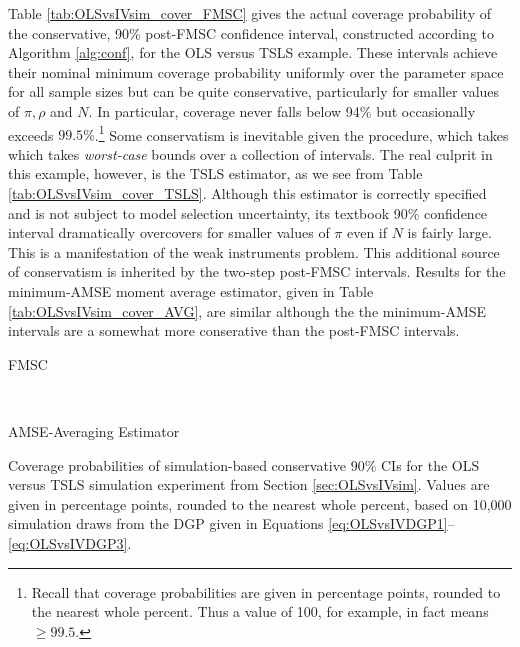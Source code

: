 Table \ref{tab:OLSvsIVsim_cover_FMSC} gives the actual coverage probability of the conservative, 90\% post-FMSC confidence interval, constructed according to Algorithm \ref{alg:conf}, for the OLS versus TSLS example.
These intervals achieve their nominal minimum coverage probability uniformly over the parameter space for all sample sizes but can be quite conservative, particularly for smaller values of $\pi, \rho$ and $N$. 
In particular, coverage never falls below 94\% but occasionally exceeds $99.5\%$.\footnote{Recall that coverage probabilities are given in percentage points, rounded to the nearest whole percent. Thus a value of 100, for example, in fact means $\geq 99.5$.}
Some conservatism is inevitable given the procedure, which takes which takes \emph{worst-case} bounds over a collection of intervals.
The real culprit in this example, however, is the TSLS estimator, as we see from Table \ref{tab:OLSvsIVsim_cover_TSLS}.
Although this estimator is correctly specified and is not subject to model selection uncertainty, its textbook 90\% confidence interval dramatically overcovers for smaller values of $\pi$ even if $N$ is fairly large.
This is a manifestation of the weak instruments problem.
This additional source of conservatism is inherited by the two-step post-FMSC intervals.
Results for the minimum-AMSE moment average estimator, given in Table \ref{tab:OLSvsIVsim_cover_AVG}, are  similar although the the minimum-AMSE intervals are a somewhat more conserative than the post-FMSC intervals.

\begin{table}[h]
\footnotesize
\centering
	\begin{subtable}{0.48\textwidth}
		\caption{FMSC}
		
		\label{tab:OLSvsIVsim_cover_FMSC}
	\end{subtable}	
	~
	\begin{subtable}{0.48\textwidth}
		\caption{AMSE-Averaging Estimator}
		
		\label{tab:OLSvsIVsim_cover_AVG}
	\end{subtable}
	\caption{Coverage probabilities of simulation-based conservative $90\%$ CIs for the OLS versus TSLS simulation experiment from Section \ref{sec:OLSvsIVsim}. Values are given in percentage points, rounded to the nearest whole percent, based on 10,000 simulation draws from the DGP given in Equations \ref{eq:OLSvsIVDGP1}--\ref{eq:OLSvsIVDGP3}.}
\end{table}

